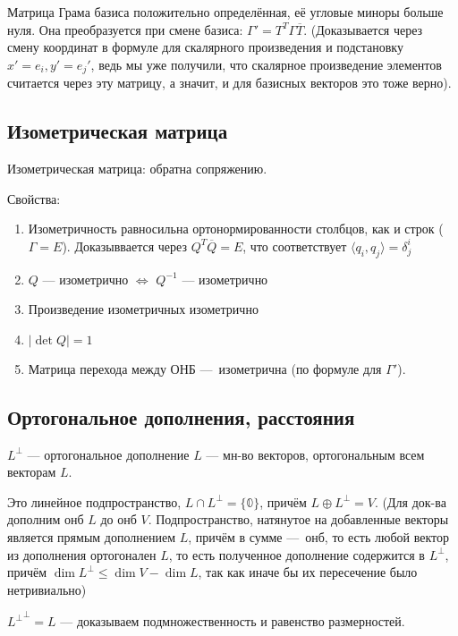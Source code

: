 \documentclass[12pt, a4paper]{article}
\begin{document}
Матрица Грама базиса положительно определённая, её угловые миноры больше нуля.
Она преобразуется при смене базиса: $\Gamma' = T^T \Gamma \overline{T}$. 
(Доказывается через смену координат в формуле для скалярного произведения и подстановку $x' = e_i, y' = e_j'$, ведь мы уже получили, 
что скалярное произведение элементов считается через эту матрицу, а значит, и для базисных векторов это тоже верно).

\subsection{Изометрическая матрица}

Изометрическая матрица: обратна сопряжению.

Свойства: 

\begin{enumerate}
    \item Изометричность равносильна ортонормированности столбцов, как и строк ($\Gamma = E$). 
    Доказыввается через $Q^T \overline{Q} = E$, что соответствует $\langle q_i, q_j \rangle = \delta^i_j$
    \item $Q$ — изометрично $\Leftrightarrow$ $Q^{-1}$ — изометрично 
    \item Произведение изометричных изометрично
    \item $| \det Q | = 1$
    \item Матрица перехода между ОНБ — изометрична (по формуле для $\Gamma'$).
\end{enumerate} 

\subsection{Ортогональное дополнения, расстояния}

$L^{\perp}$ — ортогональное дополнение $L$ — мн-во векторов, ортогональным всем векторам $L$.

Это линейное подпространство, $L \cap L^{\perp} = \{\mathbb{0}\}$, причём $L \oplus L^{\perp} = V$. 
(Для док-ва дополним онб $L$ до онб $V$. Подпространство, натянутое на добавленные векторы является прямым дополнением $L$, 
причём в сумме — онб, то есть любой вектор из дополнения ортогонален $L$, то есть полученное дополнение содержится в $L^{\perp}$,
причём $\dim L^{\perp} \leqslant \dim V - \dim L$, так как иначе бы их пересечение было нетривиально)

${L^\perp}^\perp = L$ — доказываем подмножественность и равенство размерностей.
\end{document}
